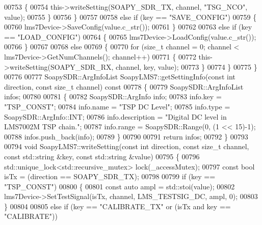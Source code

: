 \begin{DoxyCode}
{{{{{{{{{{{{{{00753         \{
00754             this->writeSetting(SOAPY\_SDR\_TX, channel, \textcolor{stringliteral}{"TSG\_NCO"}, value);
00755         \}
00756     \}
00757 
00758     \textcolor{keywordflow}{else} \textcolor{keywordflow}{if} (key == \textcolor{stringliteral}{"SAVE\_CONFIG"})
00759     \{
00760         lms7Device->SaveConfig(value.c\_str());
00761     \}
00762 
00763     \textcolor{keywordflow}{else} \textcolor{keywordflow}{if} (key == \textcolor{stringliteral}{"LOAD\_CONFIG"})
00764     \{
00765         lms7Device->LoadConfig(value.c\_str());
00766     \}
00767 
00768     \textcolor{keywordflow}{else}
00769     \{
00770         \textcolor{keywordflow}{for} (\textcolor{keywordtype}{size\_t} channel = 0; channel < lms7Device->GetNumChannels(); channel++)
00771         \{
00772             this->writeSetting(SOAPY\_SDR\_RX, channel, key, value);
00773         \}
00774     \}
00775 \}
00776 
00777 SoapySDR::ArgInfoList SoapyLMS7::getSettingInfo(\textcolor{keyword}{const} \textcolor{keywordtype}{int} direction, \textcolor{keyword}{const} \textcolor{keywordtype}{size\_t} channel)\textcolor{keyword}{ const}
00778 \textcolor{keyword}{}\{
00779     SoapySDR::ArgInfoList infos;
00780 
00781     \{
00782         SoapySDR::ArgInfo info;
00783         info.key = \textcolor{stringliteral}{"TSP\_CONST"};
00784         info.name = \textcolor{stringliteral}{"TSP DC Level"};
00785         info.type = SoapySDR::ArgInfo::INT;
00786         info.description = \textcolor{stringliteral}{"Digital DC level in LMS7002M TSP chain."};
00787         info.range = SoapySDR::Range(0, (1 << 15)-1);
00788         infos.push\_back(info);
00789     \}
00790 
00791     \textcolor{keywordflow}{return} infos;
00792 \}
00793 
00794 \textcolor{keywordtype}{void} SoapyLMS7::writeSetting(\textcolor{keyword}{const} \textcolor{keywordtype}{int} direction, \textcolor{keyword}{const} \textcolor{keywordtype}{size\_t} channel, \textcolor{keyword}{const} std::string &key, \textcolor{keyword}{const} 
      std::string &value)
00795 \{
00796     std::unique\_lock<std::recursive\_mutex> lock(_accessMutex);
00797     \textcolor{keyword}{const} \textcolor{keywordtype}{bool} isTx = (direction == SOAPY\_SDR\_TX);
00798 
00799     \textcolor{keywordflow}{if} (key == \textcolor{stringliteral}{"TSP\_CONST"})
00800     \{
00801         \textcolor{keyword}{const} \textcolor{keyword}{auto} ampl = std::stoi(value);
00802         lms7Device->SetTestSignal(isTx, channel, LMS_TESTSIG_DC, ampl, 0);
00803     \}
00804 
00805     \textcolor{keywordflow}{else} \textcolor{keywordflow}{if} (key == \textcolor{stringliteral}{"CALIBRATE\_TX"} or (isTx and key == \textcolor{stringliteral}{"CALIBRATE"}))
}}}}}}}}}}}}}}
\end{DoxyCode}
